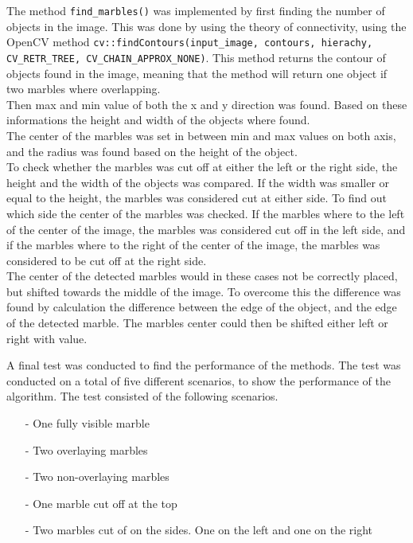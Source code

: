 \documentclass[../Head/Main.tex]{subfiles}
\begin{document}
The method \texttt{find\_marbles()} was implemented by first finding the number of objects in the image. This was done by using the theory of connectivity, using the OpenCV method \texttt{cv::findContours(input\_image, contours, hierachy, CV\_RETR\_TREE, CV\_CHAIN\_APPROX\_NONE)}. This method returns the contour of objects found in the image, meaning that the method will return one object if two marbles where overlapping.\\
Then max and min value of both the x and y direction was found. Based on these informations the height and width of the objects where found.\\
The center of the marbles was set in between min and max values on both axis, and the radius was found based on the height of the object.\\
To check whether the marbles was cut off at either the left or the right side, the height and the width of the objects was compared. If the width was smaller or equal to the height, the marbles was considered cut at either side. To find out which side the center of the marbles was checked. If the marbles where to the left of the center of the image, the marbles was considered cut off in the left side, and if the marbles where to the right of the center of the image, the marbles was considered to be cut off at the right side.\\
The center of the detected marbles would in these cases not be correctly placed, but shifted towards the middle of the image. To overcome this the difference was found by calculation the difference between the edge of the object, and the edge of the detected marble. The marbles center could then be shifted either left or right with value.\par 
A final test was conducted to find the performance of the methods. The test was conducted on a total of five different scenarios, to show the performance of the algorithm. The test consisted of the following scenarios.
\begin{itemize} \vspace{-5pt}
	\item[-] One fully visible marble \vspace{-7pt}
	\item[-] Two overlaying marbles \vspace{-7pt}
	\item[-] Two non-overlaying marbles \vspace{-7pt}
	\item[-] One marble cut off at the top \vspace{-7pt}
	\item[-] Two marbles cut of on the sides. One on the left and one on the right
\end{itemize} \vspace{-5pt}
\end{document}
